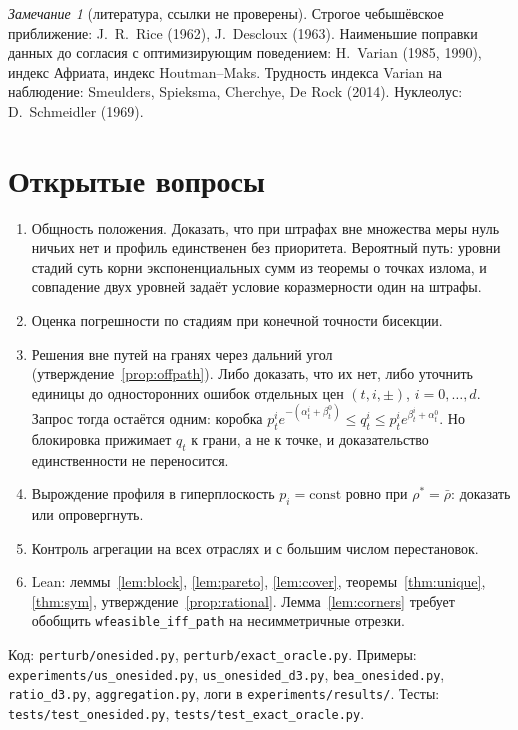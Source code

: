 \documentclass[a4paper,11pt]{article}
\theoremstyle{plain}
\theoremstyle{definition}
\theoremstyle{remark}
\newtheorem*{remark}{Замечание}
\begin{document}
\begin{remark}[литература, ссылки не проверены]
    Строгое чебышёвское приближение: J.~R.~Rice (1962), J.~Descloux (1963). Наименьшие поправки данных до согласия с оптимизирующим поведением: H.~Varian (1985, 1990), индекс Африата, индекс Houtman--Maks. Трудность индекса Varian на наблюдение: Smeulders, Spieksma, Cherchye, De Rock (2014). Нуклеолус: D.~Schmeidler (1969).
\end{remark}

\section{Открытые вопросы}

\begin{enumerate}
    \item Общность положения. Доказать, что при штрафах вне множества меры нуль ничьих нет и профиль единственен без приоритета. Вероятный путь: уровни стадий суть корни экспоненциальных сумм из теоремы о точках излома, и совпадение двух уровней задаёт условие коразмерности один на штрафы.
    \item Оценка погрешности по стадиям при конечной точности бисекции.
    \item Решения вне путей на гранях через дальний угол (утверждение~\ref{prop:offpath}). Либо доказать, что их нет, либо уточнить единицы до односторонних ошибок отдельных цен $(t,i,\pm)$, $i=0,\dots,d$. Запрос тогда остаётся одним: коробка $p^i_te^{-(\alpha^i_t+\beta^0_t)}\le q^i_t\le p^i_te^{\beta^i_t+\alpha^0_t}$. Но блокировка прижимает $q_t$ к грани, а не к точке, и доказательство единственности не переносится.
    \item Вырождение профиля в гиперплоскость $p_i=\mathrm{const}$ ровно при $\rho^*=\bar\rho$: доказать или опровергнуть.
    \item Контроль агрегации на всех отраслях и с большим числом перестановок.
    \item Lean: леммы~\ref{lem:block}, \ref{lem:pareto}, \ref{lem:cover}, теоремы~\ref{thm:unique}, \ref{thm:sym}, утверждение~\ref{prop:rational}. Лемма~\ref{lem:corners} требует обобщить \texttt{wfeasible\_iff\_path} на несимметричные отрезки.
\end{enumerate}

Код: \texttt{perturb/onesided.py}, \texttt{perturb/exact\_oracle.py}. Примеры: \texttt{experiments/us\_onesided.py}, \texttt{us\_onesided\_d3.py}, \texttt{bea\_onesided.py}, \texttt{ratio\_d3.py}, \texttt{aggregation.py}, логи в \texttt{experiments/results/}. Тесты: \texttt{tests/test\_onesided.py}, \texttt{tests/test\_exact\_oracle.py}.
\end{document}
